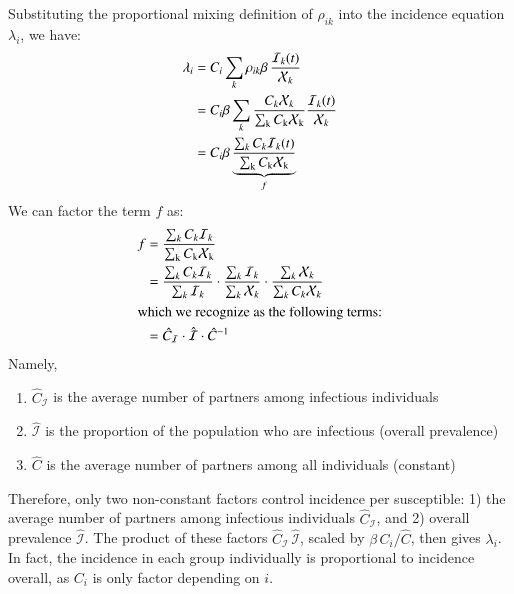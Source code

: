 Substituting the proportional mixing definition of $\rho_{ik}$ into
the incidence equation $\lambda_i$, we have:
\begin{align}
\lambda_i
  &= C_i \sum_k \rho_{ik} \beta \thinspace \frac{\mathcal{I}_k(t)}{\mathcal{X}_k}\\
  &= C_i \beta \sum_k
    \frac{C_k \mathcal{X}_k}{\sum_{\mathrm{k}}C_{\mathrm{k}}\mathcal{X}_{\mathrm{k}}}
    \frac{\mathcal{I}_k(t)}{\mathcal{X}_k}\\
  &= C_i \beta \underbrace{
      \frac{\sum_k C_k \mathcal{I}_k(t)}{\sum_{\mathrm{k}}C_{\mathrm{k}}\mathcal{X}_{\mathrm{k}}}
    }_{f}
\end{align}
We can factor the term $f$ as:
\begin{align}
  f
  &= \frac{\sum_k C_k \mathcal{I}_k}{\sum_{\mathrm{k}}C_{\mathrm{k}}\mathcal{X}_{\mathrm{k}}}\\
  &= \frac{\sum_k C_k \mathcal{I}_k}{\sum_k \mathcal{I}_k}
       \cdot
     \frac{\sum_k \mathcal{I}_k}{\sum_k \mathcal{X}_k}
       \cdot
     \frac{\sum_k \mathcal{X}_k}{\sum_k C_k \mathcal{X}_k}\\
\intertext{which we recognize as the following terms:}
  &= \hat{C}_{\mathcal{I}} \cdot \hat{\mathcal{I}} \cdot \hat{C}^{-1}
\end{align}
Namely,
\begin{enumerate}
  \item $\hat{C}_{\mathcal{I}}$ is the average number of partners among infectious individuals
  \item $\hat{\mathcal{I}}$ is the proportion of the population who are infectious (overall prevalence)
  \item $\hat{C}$ is the average number of partners among all individuals (constant)
\end{enumerate}
Therefore, only two non-constant factors control incidence per susceptible:
1) the average number of partners among infectious individuals $\hat{C}_{\mathcal{I}}$, and
2) overall prevalence $\hat{\mathcal{I}}$.
The product of these factors $\hat{C}_{\mathcal{I}}\,\hat{\mathcal{I}}$,
scaled by $\beta \, C_i / \hat{C}$,
then gives $\lambda_i$.
In fact, the incidence in each group individually is proportional to
incidence overall, as $C_i$ is only factor depending on $i$.



